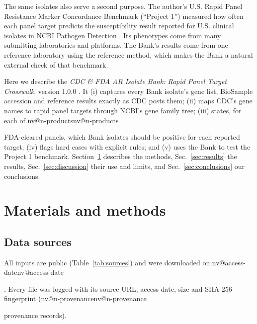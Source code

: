 \documentclass[10pt,twocolumn,letterpaper]{article}
\makeatletter
\newcommand{\nv}[1]{\ifcsname nv@#1\endcsname\csname nv@#1\endcsname\else
  \PackageError{numbers}{Unknown number key: #1}{Run build_assets.py}\fi}
\makeatother
\begin{document}
The same isolates also serve a second purpose. The author's U.S. Rapid Panel Resistance Marker Concordance Benchmark
(``Project 1'') measured how often each panel target predicts the susceptibility result reported for U.S. clinical
isolates in NCBI Pathogen Detection \cite{project1}. Its phenotypes come from many submitting laboratories and platforms.
The Bank's results come from one reference laboratory using the reference method, which makes the Bank a natural
external check of that benchmark.

Here we describe the \emph{CDC \& FDA AR Isolate Bank: Rapid Panel Target Crosswalk}, version 1.0.0 \cite{thiswork}. It
(i) captures every Bank isolate's gene list, BioSample accession and reference results exactly as CDC posts them;
(ii) maps CDC's gene names to rapid panel targets through NCBI's gene family tree; (iii) states, for each of
\nv{n-products} FDA-cleared panels, which Bank isolates should be positive for each reported target; (iv) flags hard cases
with explicit rules; and (v) uses the Bank to test the Project 1 benchmark. Section~\ref{sec:methods} describes the
methods, Sec.~\ref{sec:results} the results, Sec.~\ref{sec:discussion} their use and limits, and
Sec.~\ref{sec:conclusions} our conclusions.

\section{Materials and methods}\label{sec:methods}

\subsection{Data sources}

All inputs are public (Table~\ref{tab:sources}) and were downloaded on \nv{access-date}. Every file was logged with its
source URL, access date, size and SHA-256 fingerprint (\nv{n-provenance} provenance records).

\begin{table}[t]
\caption{Data sources.}
\label{tab:sources}
\centering\footnotesize

\end{table}
\end{document}

